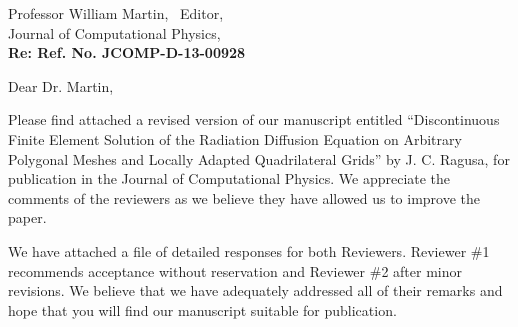 \begin{letter}{Professor William Martin, \  Editor,\\
    Journal of Computational Physics,\\
\textbf{Re: Ref. No. JCOMP-D-13-00928}}





\date{\today}

\opening{Dear Dr. Martin,}
         \vspace{0.25cm}

Please find attached a revised version of our manuscript entitled
``Discontinuous Finite Element Solution of the Radiation Diffusion Equation on Arbitrary Polygonal Meshes and Locally Adapted Quadrilateral Grids'' 
by J. C. Ragusa, for
publication in the Journal of Computational Physics. We appreciate the comments of the reviewers as we
believe they have allowed us to improve the paper.

We have attached a file of detailed responses for both Reviewers. Reviewer \#1 recommends acceptance without reservation and Reviewer \#2 after minor revisions. 
We believe that we have adequately addressed all of their remarks and hope that you will find our manuscript suitable for publication.


\end{letter}
